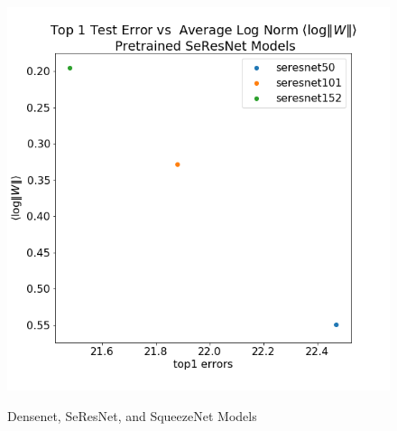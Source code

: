 \begin{figure}[!htb]
{        \includegraphics[scale=0.3]{img/SeResNet_top1-lognorms.png} 
        \label{fig:seresnet}
    }
        \caption{Densenet, SeResNet, and SqueezeNet Models}
    \label{fig:other2}
\end{figure}





